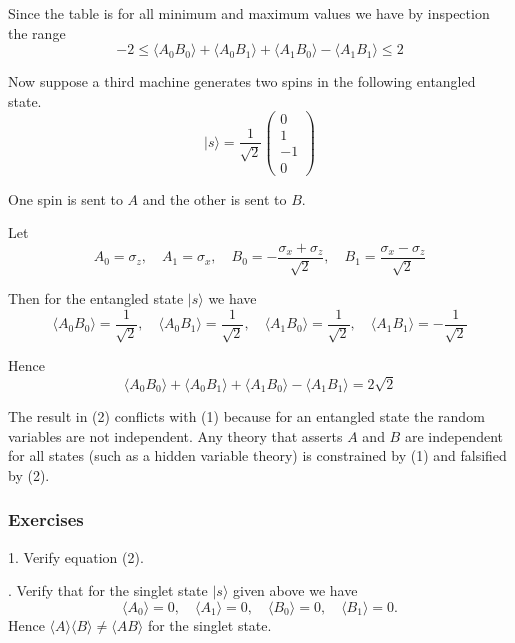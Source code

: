 Since the table is for all minimum and maximum values we have by inspection the range
\begin{equation*}
-2\le \langle A_0B_0\rangle+\langle A_0B_1\rangle+\langle A_1B_0\rangle-\langle A_1B_1\rangle\le2
\tag{1}
\end{equation*}

Now suppose a third machine generates two spins in the following entangled state.
\begin{equation*}
|s\rangle=\frac{1}{\sqrt2}\begin{pmatrix}0\\1\\-1\\0\end{pmatrix}
\end{equation*}

One spin is sent to $A$ and the other is sent to $B$.

\bigskip
Let
\begin{equation*}
A_0=\sigma_z,\quad
A_1=\sigma_x,\quad
B_0=-\frac{\sigma_x+\sigma_z}{\sqrt2},\quad
B_1=\frac{\sigma_x-\sigma_z}{\sqrt2}
\end{equation*}

Then for the entangled state $|s\rangle$ we have
\begin{equation*}
\langle A_0B_0\rangle=\frac{1}{\sqrt2},\quad
\langle A_0B_1\rangle=\frac{1}{\sqrt2},\quad
\langle A_1B_0\rangle=\frac{1}{\sqrt2},\quad
\langle A_1B_1\rangle=-\frac{1}{\sqrt2}
\end{equation*}

Hence
\begin{equation*}
\langle A_0B_0\rangle+
\langle A_0B_1\rangle+
\langle A_1B_0\rangle-
\langle A_1B_1\rangle=2\sqrt2
\tag{2}
\end{equation*}

The result in (2) conflicts with (1) because for an entangled state
the random variables are not independent.
Any theory that asserts $A$ and $B$ are independent for all states
(such as a hidden variable theory)
is constrained by (1) and falsified by (2).

\subsubsection*{Exercises}

1. Verify equation (2).

. Verify that for the singlet state $|s\rangle$ given above we have
\begin{equation*}
\langle A_0\rangle=0,\quad\langle A_1\rangle=0,\quad\langle B_0\rangle=0,\quad\langle B_1\rangle=0.
\end{equation*}
Hence $\langle A\rangle\langle B\rangle\ne\langle AB\rangle$ for the singlet state.

